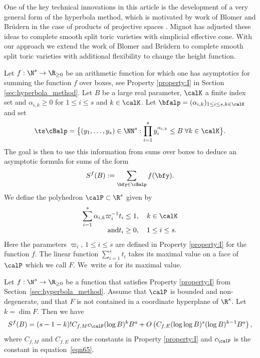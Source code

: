 One of the key technical innovations in this article is the development of a very general form of the hyperbola method, which is motivated by work of Blomer and Brüdern in the case of products of projective spaces \cite{BB}. Mignot \cite{mignot2} has adjusted these ideas to complete smooth split toric varieties with simplicial effective cone.
With our approach we extend the work of Blomer and Brüdern to complete smooth split toric varieties with additional flexibility to change the height function.\par
Let $f: \N^s\rightarrow \R_{\geq 0}$ be an arithmetic function for which one has asymptotics for summing the function $f$ over boxes, see Property \ref{property:I} in Section \ref{sec:hyperbola_method}. Let $B$ be a large real parameter, $\calK$ a finite index set and $\alpha_{i,k}\geq 0$ for $1\leq i\leq s$ and $k\in \calK$. Let $\bfalp=(\alpha_{i,k})_{1\leq i\leq s,k\in\calK}$ and set\vspace*{-3pt}
\[\ts
\cBalp=\bigl\{(y_1,\dots,y_s)\in\NN^s:\prod_{i=1}^sy_i^{\alpha_{i,k}}\leq B\;\forall k\in\calK\bigr\}.
\]
The goal is then to use this information from sums over boxes to deduce an asymptotic formula for sums of the form\vspace*{-5pt}
\begin{equation*}
S^{f}(B):=\sum_{\bfy\in\cBalp}f(\bfy).
\end{equation*}
We define the polyhedron $\calP \subset \R^s$ given by\vspace*{-5pt}
\begin{align*}
\sum_{i=1}^s \alpha_{i,k} \varpi_i^{-1} t_i&\leq 1, \quad k\in \calK
\\[-5pt]
\tag*{and}
t_i&\geq 0,\quad 1\leq i\leq s.
\end{align*}
Here the parameters $\varpi_i$, $1\leq i\leq s$ are defined in Property \ref{property:I} for the function $f$. The linear function $\sum_{i=1}^s t_i$ takes its maximal value on a face of $\calP$ which we call $F$. We~write $a$ for its maximal value.

\begin{theorem}\label{lemhyp3}
Let $f:\N^s\rightarrow \R_{\geq 0}$ be a function that satisfies Property \ref{property:I} from Section~\ref{sec:hyperbola_method}.
Assume that $\calP$ is bounded and non-degenerate, and that $F$ is not contained in a coordinate hyperplane of $\R^s$. Let $k=\dim F$. Then we have\vspace*{-3pt}
\[
S^f(B)= (s-1-k)! C_{f,M}c_{\calP} (\log B)^kB^{a}
+O\left(C_{f,E} (\log \log B)^{s} (\log B)^{k-1} B^{a} \right),
\]
where $C_{f,M}$ and $C_{f,E}$ are the constants in Property \ref{property:I} and $c_\calP$ is the constant in equation~\eqref{eqn65}.
\end{theorem}

